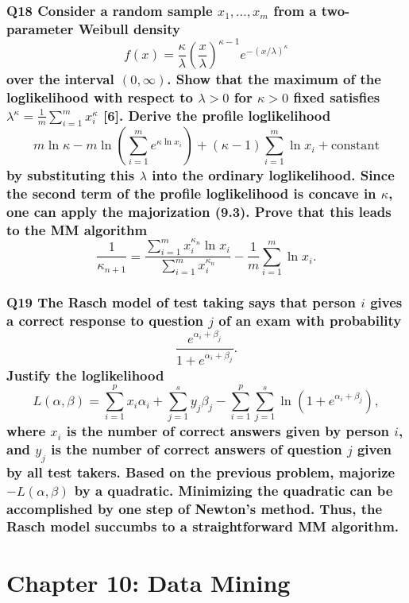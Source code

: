 \documentclass{article}
\begin{document}
\subsubsection*{Q18 Consider a random sample \( x_1, \ldots, x_m \) from a two-parameter Weibull density
\[
f(x) = \frac{\kappa}{\lambda} \left( \frac{x}{\lambda} \right)^{\kappa - 1} e^{-(x / \lambda)^\kappa}
\]
over the interval \((0, \infty)\). Show that the maximum of the loglikelihood with respect to \(\lambda > 0\) for \(\kappa > 0\) fixed satisfies \(\lambda^\kappa = \frac{1}{m} \sum_{i=1}^m x_i^\kappa\) [6]. Derive the profile loglikelihood
\[
m \ln \kappa - m \ln \left( \sum_{i=1}^m e^{\kappa \ln x_i} \right) + (\kappa - 1) \sum_{i=1}^m \ln x_i + \text{constant}
\]
by substituting this \(\lambda\) into the ordinary loglikelihood. Since the second term of the profile loglikelihood is concave in \(\kappa\), one can apply the majorization (9.3). Prove that this leads to the MM algorithm
\[
\frac{1}{\kappa_{n+1}} = \frac{\sum_{i=1}^m x_i^{\kappa_n} \ln x_i}{\sum_{i=1}^m x_i^{\kappa_n}} - \frac{1}{m} \sum_{i=1}^m \ln x_i.
\]}

\subsubsection*{Q19 The Rasch model of test taking says that person \(i\) gives a correct response to question \(j\) of an exam with probability
\[
\frac{e^{\alpha_i + \beta_j}}{1 + e^{\alpha_i + \beta_j}}.
\]
Justify the loglikelihood
\[
L(\alpha, \beta) = \sum_{i=1}^p x_i \alpha_i + \sum_{j=1}^s y_j \beta_j - \sum_{i=1}^p \sum_{j=1}^s \ln(1 + e^{\alpha_i + \beta_j}),
\]
where \(x_i\) is the number of correct answers given by person \(i\), and \(y_j\) is the number of correct answers of question \(j\) given by all test takers. Based on the previous problem, majorize \(-L(\alpha, \beta)\) by a quadratic. Minimizing the quadratic can be accomplished by one step of Newton’s method. Thus, the Rasch model succumbs to a straightforward MM algorithm.}

\newpage
\section*{Chapter 10: Data Mining}
\end{document}
